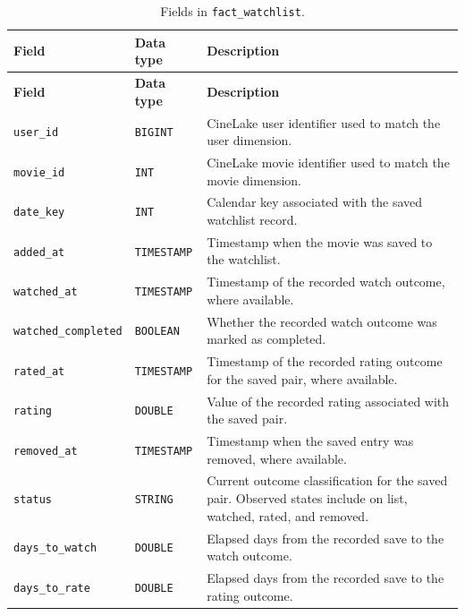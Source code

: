 \documentclass[a4paper,12pt]{article}
\newcommand{\dbsep}{\_\allowbreak}
\begin{document}
\begingroup
\small
\setlength{\tabcolsep}{4pt}
\renewcommand{\arraystretch}{1.1}
\begin{longtable}{@{}>{\raggedright\arraybackslash}p{}
                    >{\raggedright\arraybackslash}p{}
                    >{\raggedright\arraybackslash}p{}@{}}
\caption{Fields in \texttt{fact\dbsep watchlist}.}\\
\toprule
\textbf{Field} & \textbf{Data type} & \textbf{Description}\\
\midrule
\endfirsthead
\toprule
\textbf{Field} & \textbf{Data type} & \textbf{Description}\\
\midrule
\endhead
\bottomrule
\endfoot
\texttt{user\dbsep id} & \texttt{BIGINT} & CineLake user identifier used to match the user dimension.\\
\texttt{movie\dbsep id} & \texttt{INT} & CineLake movie identifier used to match the movie dimension.\\
\texttt{date\dbsep key} & \texttt{INT} & Calendar key associated with the saved watchlist record.\\
\texttt{added\dbsep at} & \texttt{TIMESTAMP} & Timestamp when the movie was saved to the watchlist.\\
\texttt{watched\dbsep at} & \texttt{TIMESTAMP} & Timestamp of the recorded watch outcome, where available.\\
\texttt{watched\dbsep completed} & \texttt{BOOLEAN} & Whether the recorded watch outcome was marked as completed.\\
\texttt{rated\dbsep at} & \texttt{TIMESTAMP} & Timestamp of the recorded rating outcome for the saved pair, where available.\\
\texttt{rating} & \texttt{DOUBLE} & Value of the recorded rating associated with the saved pair.\\
\texttt{removed\dbsep at} & \texttt{TIMESTAMP} & Timestamp when the saved entry was removed, where available.\\
\texttt{status} & \texttt{STRING} & Current outcome classification for the saved pair. Observed states include on list, watched, rated, and removed.\\
\texttt{days\dbsep to\dbsep watch} & \texttt{DOUBLE} & Elapsed days from the recorded save to the watch outcome.\\
\texttt{days\dbsep to\dbsep rate} & \texttt{DOUBLE} & Elapsed days from the recorded save to the rating outcome.\\
\end{longtable}
\endgroup
\end{document}
